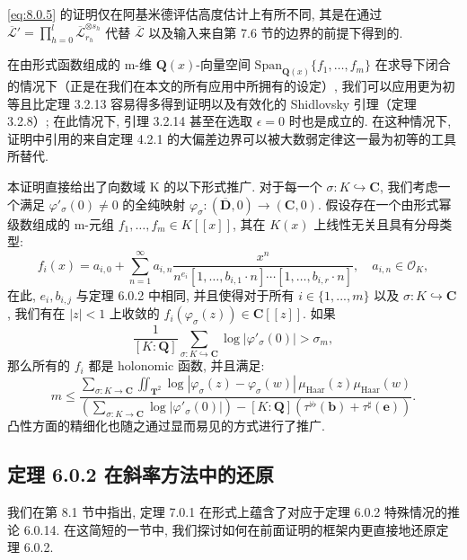 \eqref{eq:8.0.5} 的证明仅在阿基米德评估高度估计上有所不同, 
其是在通过 \(\overline{\mathcal{L}}' = \prod_{h=0}^{l} \overline{\mathcal{L}}_{r_h}^{\otimes s_h}\) 
代替 \(\overline{\mathcal{L}}\) 以及输入来自第 7.6 节的边界的前提下得到的.

\begin{remark}\label{rem:8.2.41}
在由形式函数组成的 m-维 \(\mathbf{Q}(x)\)-向量空间 \(\mathrm{Span}_{\mathbf{Q}(x)}\{f_1,\ldots,f_m\}\) 
在求导下闭合的情况下（正是在我们在本文的所有应用中所拥有的设定）, 
我们可以应用更为初等且比定理 3.2.13 容易得多得到证明以及有效化的 Shidlovsky 引理（定理 3.2.8）; 
在此情况下, 引理 3.2.14 甚至在选取 \(\epsilon = 0\) 时也是成立的. 
在这种情况下, 证明中引用的来自定理 4.2.1 的大偏差边界可以被大数弱定律这一最为初等的工具所替代. \end{remark}

\begin{remark}\label{rem:8.2.42}
本证明直接给出了向数域 K 的以下形式推广. 
对于每一个 \(\sigma: K \hookrightarrow \mathbf{C}\), 我们考虑一个满足 \(\varphi'_{\sigma}(0) \neq 0\) 
的全纯映射 \(\varphi_{\sigma}: (\overline{\mathbf{D}},0) \to (\mathbf{C},0)\). 
假设存在一个由形式幂级数组成的 m-元组 \(f_1,\ldots,f_m \in K[\![x]\!]\), 
其在 \(K(x)\) 上线性无关且具有分母类型:
\[ f_i(x) = a_{i,0} + \sum_{n=1}^{\infty} a_{i,n} \frac{x^n}{n^{e_i}[1,\dots,b_{i,1} \cdot n] \cdots [1,\dots,b_{i,r} \cdot n]}, \quad a_{i,n} \in \mathcal{O}_K, \]
在此, \(e_i, b_{i,j}\) 与定理 6.0.2 中相同, 并且使得对于所有 \(i \in \{1, ..., m\}\) 以及 \(\sigma : K \hookrightarrow \mathbf{C}\), 
我们有在 \(|z| < 1\) 上收敛的 \(f_i(\varphi_{\sigma}(z)) \in \mathbf{C}[\![z]\!]\). 
如果
\[ \frac{1}{[K:\mathbf{Q}]} \sum_{\sigma: K \hookrightarrow \mathbf{C}} \log |\varphi'_{\sigma}(0)| > \sigma_m, \]
那么所有的 \(f_i\) 都是 holonomic 函数, 并且满足:
\[ m \leq \frac{\sum_{\sigma:K \to \mathbf{C}} \iint_{\mathbf{T}^2} \log |\varphi_{\sigma}(z) - \varphi_{\sigma}(w)| \, \mu_{\mathrm{Haar}}(z) \mu_{\mathrm{Haar}}(w)}{(\sum_{\sigma:K \to \mathbf{C}} \log |\varphi'_{\sigma}(0)|) - [K:\mathbf{Q}](\tau^{\flat\flat}(\mathbf{b}) + \tau^{\sharp}(\mathbf{e}))}. \]
凸性方面的精细化也随之通过显而易见的方式进行了推广. \end{remark}

\subsection{定理 6.0.2 在斜率方法中的还原}\label{sec:8.3}

我们在第 8.1 节中指出, 定理 7.0.1 在形式上蕴含了对应于定理 6.0.2 特殊情况的推论 6.0.14. 
在这简短的一节中, 我们探讨如何在前面证明的框架内更直接地还原定理 6.0.2.

